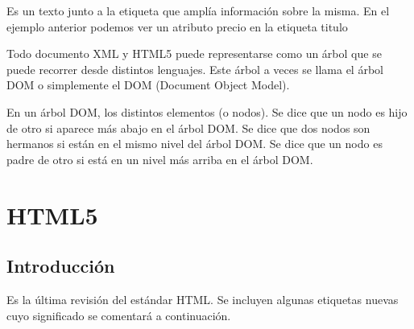 \documentclass[letterpaper,10pt,spanish]{sphinxmanual}
\begin{document}
 Es un texto junto a la etiqueta que amplía información sobre la misma. En el ejemplo
anterior podemos ver un atributo precio en la etiqueta titulo

 Todo documento XML y HTML5 puede representarse como un árbol
que se puede recorrer desde distintos lenguajes. Este árbol a veces se llama el árbol DOM
o simplemente el DOM (Document Object Model).

 En un árbol DOM, los distintos elementos (o nodos). Se dice que
un nodo es hijo de otro si aparece más abajo en el árbol DOM. Se dice que dos nodos
son hermanos si están en el mismo nivel del árbol DOM. Se dice que un nodo es padre
de otro si está en un nivel más arriba en el árbol DOM.


\chapter{HTML5}
\label{\detokenize{tema2:html5}}\label{\detokenize{tema2::doc}}

\section{Introducción}
\label{\detokenize{tema2:introduccion}}
Es la última revisión del estándar HTML. Se incluyen algunas etiquetas nuevas cuyo significado
se comentará a continuación.
\end{document}
